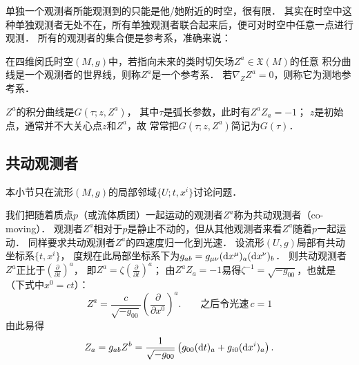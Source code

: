 

单独一个观测者所能观测到的只能是他/她附近的时空，很有限．
其实在时空中这种单独观测者无处不在，所有单独观测者联合起来后，便可对时空中任意一点进行观测．
所有的观测者的集合便是参考系，准确来说：

\begin{definition}\label{chfd:def_reference-frame}
    在四维闵氏时空$(M,g)$中，若指向未来的类时切矢场$Z^a\in \mathfrak{X}(M)$的任意
    积分曲线是一个观测者的世界线，则称$Z^a$是一个{\heiti 参考系}．
    若$\nabla_Z Z^a=0$，则称它为{\heiti 测地参考系}．
\end{definition}

$Z^a$的积分曲线是$G(\tau ;z,Z^a)$，
其中$\tau$是弧长参数，此时有$Z^a Z_a=-1$；
$z$是初始点，通常并不大关心点$z$和$Z^a$，故
常常把$G(\tau ;z,Z^a)$简记为$G(\tau)$．



\subsection{共动观测者}\label{chfd:sec_comoving}
本小节只在流形$(M,g)$的局部邻域$\{U;t,x^i\}$讨论问题．

我们把随着质点$p$（或流体质团）一起运动的观测者$Z^a$称为{\heiti 共动观测者}（co-moving）．
观测者$Z^a$相对于$p$是静止不动的，但从其他观测者来看$Z^a$随着$p$一起运动．
同样要求共动观测者$Z^a$的四速度归一化到光速．
设流形$(U,g)$局部有共动坐标系$\{t,x^i\}$，
度规在此局部坐标系下为$g_{ab}=g_{\mu\nu}({\rm d}x^\mu)_a ({\rm d}x^\nu)_b$．
则共动观测者$Z^a$正比于$(\frac{\partial}{\partial t})^a$，
即$Z^a= \zeta (\frac{\partial}{\partial t})^a$；
由$Z^a Z_a=-1$易得$\zeta^{-1}=\sqrt{-g_{00}}$，也就是（下式中$x^0=ct$）：
\begin{equation}\label{chfd:eqn_CM-Zu}
    Z^a= \frac{c}{\sqrt{-g_{00}}} \left(\frac{\partial}{\partial x^0}\right)^a .
    \qquad \text{之后令光速} \,  c=1 
\end{equation}
由此易得
\begin{equation}\label{chfd:eqn_CM-Zd}
    Z_a= g_{ab}Z^b =\frac{1}{\sqrt{-g_{00}}}\left(
    g_{00}({\rm d}t)_a + g_{i0} ({\rm d}x^i)_a\right) .
\end{equation}

